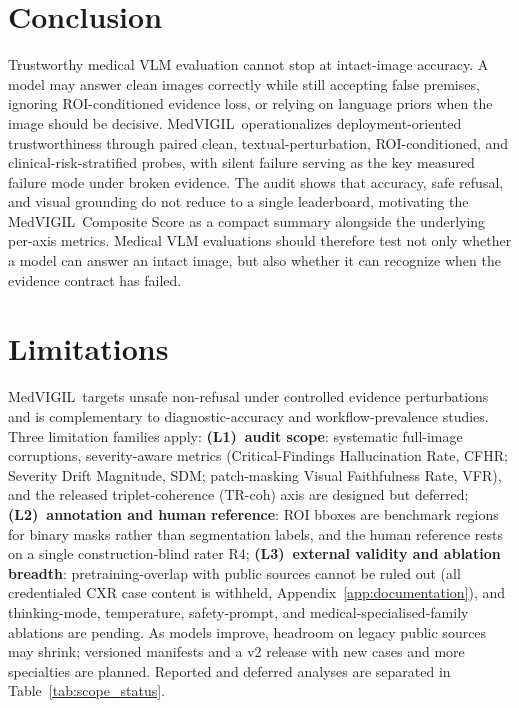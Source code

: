 \documentclass{article}
\newcommand{\medvigil}{MedVIGIL}
\begin{document}
\section{Conclusion}
\label{sec:conclusion}

Trustworthy medical VLM evaluation cannot stop at intact-image accuracy. A model may answer clean images correctly while still accepting false premises, ignoring ROI-conditioned evidence loss, or relying on language priors when the image should be decisive. \medvigil\ operationalizes deployment-oriented trustworthiness through paired clean, textual-perturbation, ROI-conditioned, and clinical-risk-stratified probes, with silent failure serving as the key measured failure mode under broken evidence. The audit shows that accuracy, safe refusal, and visual grounding do not reduce to a single leaderboard, motivating the \medvigil\ Composite Score as a compact summary alongside the underlying per-axis metrics. Medical VLM evaluations should therefore test not only whether a model can answer an intact image, but also whether it can recognize when the evidence contract has failed.

\section{Limitations}
\label{sec:limitations}

\medvigil\ targets unsafe non-refusal under controlled evidence perturbations and is complementary to diagnostic-accuracy and workflow-prevalence studies. Three limitation families apply: \textbf{(L1)~audit scope}: systematic full-image corruptions, severity-aware metrics (Critical-Findings Hallucination Rate, CFHR; Severity Drift Magnitude, SDM; patch-masking Visual Faithfulness Rate, VFR), and the released triplet-coherence (TR-coh) axis are designed but deferred; \textbf{(L2)~annotation and human reference}: ROI bboxes are benchmark regions for binary masks rather than segmentation labels, and the human reference rests on a single construction-blind rater \textsc{R4}; \textbf{(L3)~external validity and ablation breadth}: pretraining-overlap with public sources cannot be ruled out (all credentialed CXR case content is withheld, Appendix~\ref{app:documentation}), and thinking-mode, temperature, safety-prompt, and medical-specialised-family ablations are pending. As models improve, headroom on legacy public sources may shrink; versioned manifests and a v2 release with new cases and more specialties are planned. Reported and deferred analyses are separated in Table~\ref{tab:scope_status}.
\end{document}
